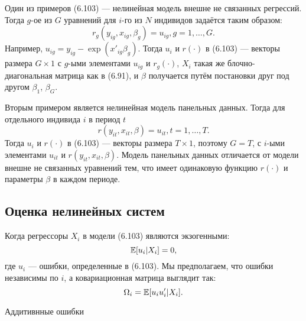 Один из примеров (6.103) --- нелинейная модель внешне не связанных регрессий. Тогда $g$-ое из $G$ уравнений для $i$-го из $N$ индивидов задаётся таким образом:
\begin{equation}
r_g(y_{ig},x_{ig},\beta_g)=u_{ig}, g=1, \dots, G.
\end{equation}
Например, $u_{ig}=y_{ig}-\exp(x'_{ig} \beta_g)$. Тогда $u_i$ и $r(\cdot)$ в (6.103) --- векторы размера $G \times 1$ с $g$-ыми элементами $u_{ig}$ и $r_g(\cdot)$, $X_i$ такая же блочно-диагональная матрица как в (6.91), и $\beta$ получается путём постановки друг под другом $\beta_1$, $\beta_G$.

Вторым примером является нелинейная модель панельных данных. Тогда для отдельного индивида $i$ в период $t$
\begin{equation}
r(y_{it},x_{it},\beta)=u_{it}, t=1, \dots, T.
\end{equation}
Тогда $u_i$ и $r(\cdot)$ в (6.103) --- векторы размера $T \times 1$, поэтому $G=T$, с $i$-ыми элементами $u_{it}$ и $r(y_{it},x_{it},\beta)$. Модель панельных данных отличается от модели внешне не связанных уравнений тем, что имеет одинаковую функцию $r(\cdot)$ и параметры $\beta$ в каждом периоде.

\subsection{Оценка нелинейных систем}

Когда регрессоры $X_i$ в модели (6.103) являются экзогенными:
\begin{equation}
\mathbb{E}[u_i|X_i]=0,
\end{equation}
где $u_i$ --- ошибки, определенные в (6.103). Мы предполагаем, что ошибки независимы по $i$, а ковариационная матрица выглядит так:
\begin{equation}
\Omega_i = \mathbb{E}[u_iu_i'|X_i].
\end{equation}

\begin{center}
Аддитивнные ошибки
\end{center}

